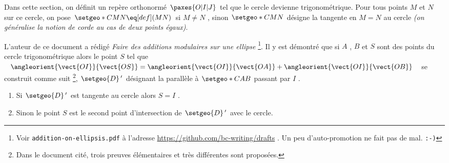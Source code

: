 Dans cette section, on définit un repère orthonormé $\paxes{O | I | J}$ tel que le cercle devienne trigonométrique.
Pour tous points $M$  et $N$ sur ce cercle, on pose $\setgeo*{C}{MN} \eq[def] (MN)$ si $M \neq N$ , sinon $\setgeo*{C}{MN}$ désigne la tangente en $M = N$ au cercle \emph{(on généralise la notion de corde au cas de deux points égaux)}.


\medskip


L'auteur de ce document a rédigé \emph{\og Faire des additions modulaires sur une ellipse \fg}
\footnote{
	Voir \texttt{addition-on-ellipsis.pdf} à l'adresse \url{https://github.com/bc-writing/drafts} .
	Un peu d'auto-promotion ne fait pas de mal. \texttt{:-)}
}.
Il y est démontré que si $A$ , $B$ et $S$ sont des points du cercle trigonométrique alors le point $S$ tel que
$\angleorient{\vect{OI}}{\vect{OS}} = \angleorient{\vect{OI}}{\vect{OA}} + \angleorient{\vect{OI}}{\vect{OB}}$
se construit comme suit
\footnote{
	Dans le document cité, trois preuves élémentaires et très différentes sont proposées. 
},
$\setgeo{D}\,'$ désignant la parallèle à $\setgeo*{C}{AB}$ passant par $I$ .

\begin{enumerate}
	\item Si $\setgeo{D}\,'$ est tangente au cercle alors $S = I$ .
	
	\item Sinon le point $S$ est le second point d'intersection de $\setgeo{D}\,'$ avec le cercle.
\end{enumerate}


\vspace{1em}

\begin{center}
\end{center}

